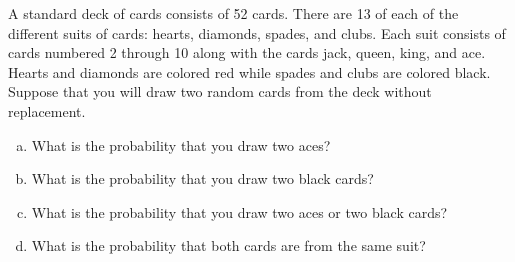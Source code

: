 \documentclass[11pt,letterpaper]{article}
\begin{document}
\newpage



 A standard deck of cards consists of 52 cards. There are 13 of each of the different suits of cards: hearts, diamonds, spades, and clubs. Each suit consists of cards numbered 2 through 10 along with the cards jack, queen, king, and ace. Hearts and diamonds are colored red while spades and clubs are colored black. Suppose that you will draw two random cards from the deck without replacement.
	\begin{enumerate}[(a)]
	\item What is the probability that you draw two aces?
	\item What is the probability that you draw two black cards?
	\item What is the probability that you draw two aces or two black cards?
	\item What is the probability that both cards are from the same suit?
	\end{enumerate} \pspace
\end{document}
